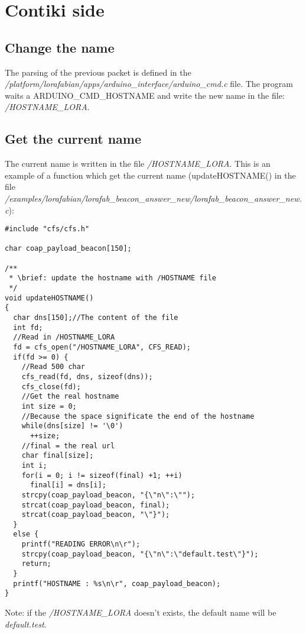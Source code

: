 \documentclass{article}
\begin{document}
\section{Contiki side}
\subsection{Change the name}
The parsing of the previous packet is defined in the\\ \emph{/platform/lorafabian/apps/arduino\_interface/arduino\_cmd.c} file. The program waits a ARDUINO\_CMD\_HOSTNAME and write the new name in the file: \emph{/HOSTNAME\_LORA}.
\subsection{Get the current name}
The current name is written in the file \emph{/HOSTNAME\_LORA}. This is an example of a function which get the current name (updateHOSTNAME() in the file\\ \emph{/examples/lorafabian/lorafab\_beacon\_answer\_new/lorafab\_beacon\_answer\_new.c}):
\begin{verbatim}
#include "cfs/cfs.h"

char coap_payload_beacon[150];

/**
 * \brief: update the hostname with /HOSTNAME file
 */
void updateHOSTNAME()
{
  char dns[150];//The content of the file
  int fd;
  //Read in /HOSTNAME_LORA
  fd = cfs_open("/HOSTNAME_LORA", CFS_READ);
  if(fd >= 0) {
    //Read 500 char
    cfs_read(fd, dns, sizeof(dns));
    cfs_close(fd);
    //Get the real hostname
    int size = 0;
    //Because the space significate the end of the hostname
    while(dns[size] != '\0')
      ++size;
    //final = the real url
    char final[size];
    int i;
    for(i = 0; i != sizeof(final) +1; ++i)
      final[i] = dns[i];
    strcpy(coap_payload_beacon, "{\"n\":\"");
    strcat(coap_payload_beacon, final);
    strcat(coap_payload_beacon, "\"}");
  }
  else {
    printf("READING ERROR\n\r");
    strcpy(coap_payload_beacon, "{\"n\":\"default.test\"}");
    return;
  }
  printf("HOSTNAME : %s\n\r", coap_payload_beacon);
}
\end{verbatim}
Note: if the \emph{/HOSTNAME\_LORA} doesn't exists, the default name will be \emph{default.test}.
\end{document}
